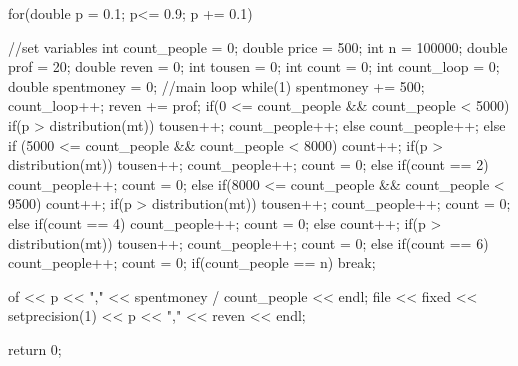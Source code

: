 \documentclass[fleqn, a4paper. 12pt]{ltjsarticle} %
\begin{document}
\begin{cppcode}
{    for(double p = 0.1; p<= 0.9; p += 0.1){
        //set variables
        int count_people = 0;
        double price = 500;
        int n = 100000;
        double prof = 20;
        double reven = 0;
        int tousen = 0;
        int count = 0;
        int count_loop = 0;
        double spentmoney = 0;
        //main loop
        while(1){
            spentmoney += 500;
            count_loop++;
            reven += prof;
            if(0 <= count_people && count_people < 5000){
                if(p > distribution(mt)){
                    tousen++;
                    count_people++;
                }
                else{
                    count_people++;
                }
            }
            else if (5000 <= count_people && count_people < 8000){
                count++;
                if(p > distribution(mt)){
                    tousen++;
                    count_people++;
                    count = 0;
                }
                else if(count == 2){
                    count_people++;
                    count = 0;
                }
            }
            else if(8000 <= count_people && count_people < 9500){
                count++;
                if(p > distribution(mt)){
                    tousen++;
                    count_people++;
                    count = 0;
                }
                else if(count == 4){
                    count_people++;
                    count = 0;
                }
            }
            else{
                count++;
                if(p > distribution(mt)){
                    tousen++;
                    count_people++;
                    count = 0;
                }
                else if(count == 6){
                    count_people++;
                    count = 0;
                }
            }
            if(count_people == n){
                break;
            }
        }

        of << p << "," << spentmoney / count_people << endl;
        file << fixed << setprecision(1) << p << "," << reven << endl;
        }
    return 0;
}
\end{cppcode}
\end{document}
